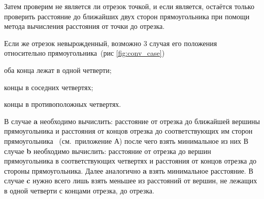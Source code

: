 Затем проверим  не является ли отрезок точкой, и если является, остаётся только проверить расстояние до ближайших двух сторон прямоугольника при помощи метода вычисления расстояния от точки до отрезка.

Если же отрезок невырожденный, возможно 3 случая его положения относительно прямоугольника~(рис \ref{fig:conv_case})
\begin{list}{a}{}
\item[\textbf{a}] оба конца лежат в одной четверти;
\item[\textbf{b}] концы в соседних четвертях;
\item[\textbf{c}] концы в противоположных четвертях.
\end{list}
В случае \textbf{a} необходимо вычислить: расстояние от отрезка до ближайшей вершины прямоугольника и расстояния от концов отрезка до соответствующих им сторон прямоугольника~
(см.~приложение А) после чего взять минимальное из них
В случае \textbf{b} необходимо вычислить: расстояние от отрезка до вершин прямоугольника в соответствующих четвертях и расстояния от концов отрезка до стороны прямоугольника. Далее аналогично \textbf{a} взять минимальное расстояние.
В случае \textbf{c} нужно всего лишь взять меньшее из расстояний от вершин, не лежащих в одной четверти с концами отрезка, до отрезка.
